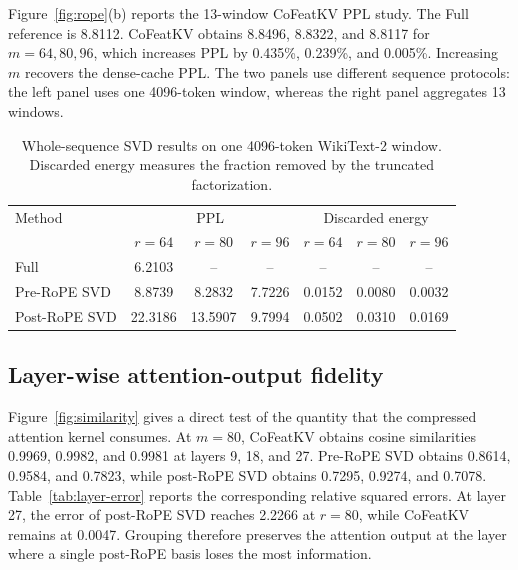 \documentclass{article} %
\begin{document}
Figure~\ref{fig:rope}(b) reports the 13-window CoFeatKV PPL study. The Full
reference is 8.8112. CoFeatKV obtains 8.8496, 8.8322, and 8.8117 for
$m=64,80,96$, which increases PPL by 0.435\%, 0.239\%, and 0.005\%.
Increasing $m$ recovers the dense-cache PPL. The two panels use different
sequence protocols: the left panel uses one 4096-token window, whereas the
right panel aggregates 13 windows.

\begin{table}[H]
    \centering
    \caption{Whole-sequence SVD results on one 4096-token WikiText-2 window.
    Discarded energy measures the fraction removed by the truncated factorization.}
    \label{tab:rope-ppl}
    \small
    \setlength{\tabcolsep}{3.5pt}
    \begin{tabular}{lccc|ccc}
        \toprule
        Method & \multicolumn{3}{c|}{PPL} & \multicolumn{3}{c}{Discarded energy} \\
        & $r=64$ & $r=80$ & $r=96$ & $r=64$ & $r=80$ & $r=96$ \\
        \midrule
        Full & 6.2103 & -- & -- & -- & -- & -- \\
        Pre-RoPE SVD  & 8.8739 & 8.2832 & 7.7226 & 0.0152 & 0.0080 & 0.0032 \\
        Post-RoPE SVD & 22.3186 & 13.5907 & 9.7994 & 0.0502 & 0.0310 & 0.0169 \\
        \bottomrule
    \end{tabular}
\end{table}


\subsection{Layer-wise attention-output fidelity}



Figure~\ref{fig:similarity} gives a direct test of the quantity that the
compressed attention kernel consumes. At $m=80$, CoFeatKV obtains cosine
similarities 0.9969, 0.9982, and 0.9981 at layers 9, 18, and 27. Pre-RoPE SVD
obtains 0.8614, 0.9584, and 0.7823, while post-RoPE SVD obtains 0.7295, 0.9274,
and 0.7078. Table~\ref{tab:layer-error} reports the corresponding relative
squared errors. At layer 27, the error of post-RoPE SVD reaches 2.2266 at
$r=80$, while CoFeatKV remains at 0.0047. Grouping therefore preserves the
attention output at the layer where a single post-RoPE basis loses the most
information.
\end{document}
